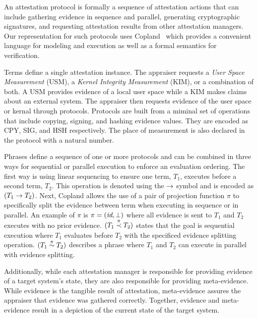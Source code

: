 \documentclass[sigconf,authordraft]{acmart}
\begin{document}
An attestation protocol is formally a sequence of attestation actions
that can include gathering evidence in sequence and parallel,
generating cryptographic signatures, and requesting attestation
results from other attestation managers.  Our representation for such
protocols uses Copland~\citep{Ramsdell:2019aa} which provides a
convenient language for modeling and execution as well as a formal
semantics for verification.


Terms define a single attestation instance. The appraiser requests a \emph{User
  Space Measurement} (USM), a \emph{Kernel Integrity Measurement}
(KIM), or a combination of both. A USM
provides evidence of a local user space while a KIM makes claims
about an external system. The appraiser then requests evidence of the user space or kernal through protocols.  Protocols are built from a miminal set of operations that
include copying, signing, and hashing evidence values. They are
encoded as CPY, SIG, and HSH respectively. The place of measurement is also declared in the protocol with a natural number.

Phrases define a sequence of one or more protocols and can be combined
in three ways for sequential or parallel execution to enforce an
evaluation ordering. The first way is using linear sequencing to
ensure one term, $T_1$, executes before a second term, $T_2$. This
operation is denoted using the $\to$ symbol and is encoded as
$(T_1\to T_2)$. Next, Copland allows the use of a pair of
projection function $\pi$ to specifically split the evidence between
term when executing in sequence or in parallel. An example of $\pi$ is
$\pi = (\emph{id} , \bot) $ where all evidence is sent to $T_1$ and
$T_2$ executes with no prior evidence. $(T_1\stackrel{\pi}{\prec} T_2)$ states
that the goal is sequential execution where $T_1$ evaluates before
$T_2$ with the specificed evidence splitting
operation. $(T_1\stackrel{\pi}{\sim} T_2)$ describes a phrase where $T_1$ and
$T_2$ can execute in parallel with evidence splitting.



Additionally, while each attestation manager is responsible for
providing evidence of a target system's state, they are also
responsible for providing meta-evidence. While evidence is the
tangible result of attestation, meta-evidence assures the appraiser
that evidence was gathered correctly. Together, evidence and
meta-evidence result in a depiction of the current state of the target
system.
\end{document}
